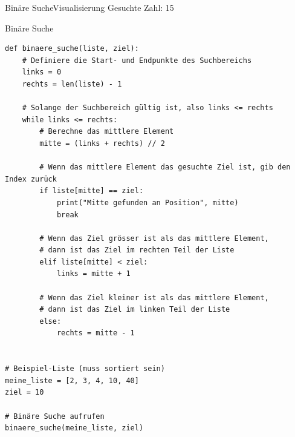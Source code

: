 \begin{frame}[fragile]{Binäre Suche}{Visualisierung}
Gesuchte Zahl: 15


% 
% 
%  
%  
\end{frame}
\begin{frame}[fragile]{Binäre Suche}
	\begin{lstlisting}[basicstyle=\tiny\ttfamily]
def binaere_suche(liste, ziel):
    # Definiere die Start- und Endpunkte des Suchbereichs
    links = 0
    rechts = len(liste) - 1

    # Solange der Suchbereich gültig ist, also links <= rechts
    while links <= rechts:
        # Berechne das mittlere Element
        mitte = (links + rechts) // 2

        # Wenn das mittlere Element das gesuchte Ziel ist, gib den Index zurück
        if liste[mitte] == ziel:
            print("Mitte gefunden an Position", mitte)
            break

        # Wenn das Ziel grösser ist als das mittlere Element,
        # dann ist das Ziel im rechten Teil der Liste
        elif liste[mitte] < ziel:
            links = mitte + 1

        # Wenn das Ziel kleiner ist als das mittlere Element,
        # dann ist das Ziel im linken Teil der Liste
        else:
            rechts = mitte - 1


# Beispiel-Liste (muss sortiert sein)
meine_liste = [2, 3, 4, 10, 40]
ziel = 10

# Binäre Suche aufrufen
binaere_suche(meine_liste, ziel)
	\end{lstlisting}
\end{frame}

